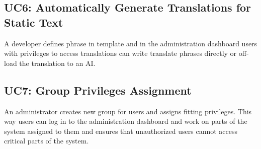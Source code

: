 \subsection*{UC6: Automatically Generate Translations for Static Text}
A developer defines phrase in template and in the administration dashboard users with privileges to access translations
can write translate phrases directly or off-load the translation to an AI\@.

\subsection*{UC7: Group Privileges Assignment}
An administrator creates new group for users and assigns fitting privileges.
This way users can log in to the administration dashboard and work on parts of the system assigned to them and
ensures that unauthorized users cannot access critical parts of the system.
